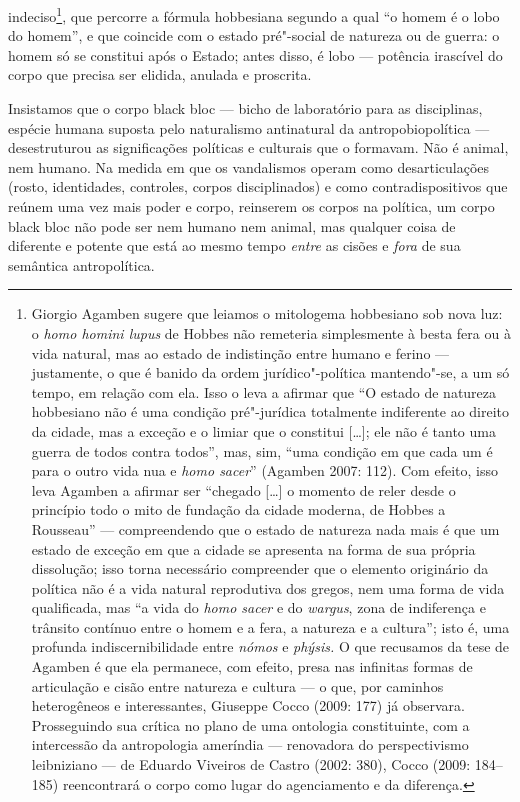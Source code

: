 indeciso\footnote{Giorgio Agamben sugere que leiamos o
  mitologema hobbesiano sob nova luz: o \emph{homo homini lupus} de
  Hobbes não remeteria simplesmente à besta fera ou à vida natural, mas
  ao estado de indistinção entre humano e ferino --- justamente, o que é
  banido da ordem jurídico"-política mantendo"-se, a um só tempo, em
  relação com ela. Isso o leva a afirmar que ``O estado de natureza
  hobbesiano não é uma condição pré"-jurídica totalmente indiferente ao
  direito da cidade, mas a exceção e o limiar que o constitui {[}\ldots{}{]};
  ele não é tanto uma guerra de todos contra todos'', mas, sim, ``uma
  condição em que cada um é para o outro vida nua e \emph{homo sacer}''
  (Agamben 2007: 112). Com efeito, isso leva Agamben a
  afirmar ser ``chegado {[}\ldots{}{]} o momento de reler desde o princípio
  todo o mito de fundação da cidade moderna, de Hobbes a Rousseau'' ---
  compreendendo que o estado de natureza nada mais é que um estado de
  exceção em que a cidade se apresenta na forma de sua própria
  dissolução; isso torna necessário compreender que o elemento
  originário da política não é a vida natural reprodutiva dos gregos,
  nem uma forma de vida qualificada, mas ``a vida do \emph{homo sacer} e
  do \emph{wargus}, zona de indiferença e trânsito contínuo entre o
  homem e a fera, a natureza e a cultura''; isto é, uma profunda
  indiscernibilidade entre \emph{nómos} e \emph{phýsis.} O que recusamos
  da tese de Agamben é que ela permanece, com efeito, presa nas
  infinitas formas de articulação e cisão entre natureza e cultura --- o
  que, por caminhos heterogêneos e interessantes, Giuseppe Cocco (2009:
  177) já observara. Prosseguindo sua crítica no plano de uma ontologia
  constituinte, com a intercessão da antropologia ameríndia ---
  renovadora do perspectivismo leibniziano --- de Eduardo Viveiros de
  Castro (2002: 380), Cocco (2009: 184--185) reencontrará o corpo como
  lugar do agenciamento e da diferença.}, que percorre a fórmula
hobbesiana segundo a qual ``o homem é o lobo do homem'', e que coincide
com o estado pré"-social de natureza ou de guerra: o homem só se
constitui após o Estado; antes disso, é lobo --- potência irascível do
corpo que precisa ser elidida, anulada e proscrita.

Insistamos que o corpo black bloc --- bicho de laboratório para as
disciplinas, espécie humana suposta pelo naturalismo antinatural da
antropobiopolítica --- desestruturou as significações políticas e
culturais que o formavam. Não é animal, nem humano. Na medida em que os
vandalismos operam como desarticulações (rosto, identidades, controles,
corpos disciplinados) e como contradispositivos que reúnem uma vez mais
poder e corpo, reinserem os corpos na política, um corpo black bloc não
pode ser nem humano nem animal, mas qualquer coisa de diferente e
potente que está ao mesmo tempo \emph{entre }as cisões e
\emph{fora }de sua semântica antropolítica.

